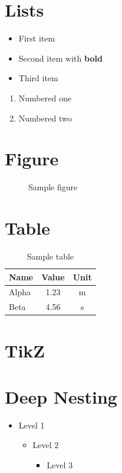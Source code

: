 \documentclass{article}
\begin{document}
\section{Lists}
\begin{itemize}
  \item First item
  \item Second item with \textbf{bold}
  \item Third item
\end{itemize}

\begin{enumerate}
  \item Numbered one
  \item Numbered two
\end{enumerate}

\section{Figure}
\begin{figure}[h]
  \centering
  \caption{Sample figure}
  \label{fig:sample}
\end{figure}

\section{Table}
\begin{table}[h]
  \centering
  \begin{tabular}{lcc}
    \toprule
    Name  & Value & Unit \\
    \midrule
    Alpha & 1.23  & m \\
    Beta  & 4.56  & s \\
    \bottomrule
  \end{tabular}
  \caption{Sample table}
  \label{tab:sample}
\end{table}

\section{TikZ}

\section{Deep Nesting}
\begin{itemize}
  \item Level 1
  \begin{itemize}
    \item Level 2
    \begin{itemize}
      \item Level 3
    \end{itemize}
  \end{itemize}
\end{itemize}
\end{document}
